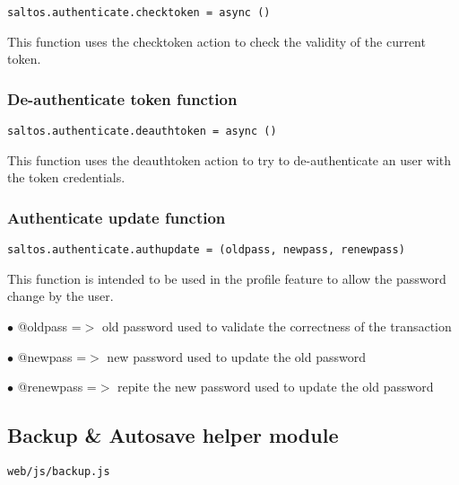 \documentclass[a4paper]{article}
\begin{document}
\begin{lstlisting}
saltos.authenticate.checktoken = async ()
\end{lstlisting}

This function uses the checktoken action to check the validity of the current token.

\hypertarget{toc585}{}
\subsubsection{De-authenticate token function}

\begin{lstlisting}
saltos.authenticate.deauthtoken = async ()
\end{lstlisting}

This function uses the deauthtoken action to try to de-authenticate an user with the token
credentials.

\hypertarget{toc586}{}
\subsubsection{Authenticate update function}

\begin{lstlisting}
saltos.authenticate.authupdate = (oldpass, newpass, renewpass)
\end{lstlisting}

This function is intended to be used in the profile feature to allow the password change
by the user.

\begin{compactitem}
\item[\color{myblue}$\bullet$] @oldpass   =$>$ old password used to validate the correctness of the transaction
\item[\color{myblue}$\bullet$] @newpass   =$>$ new password used to update the old password
\item[\color{myblue}$\bullet$] @renewpass =$>$ repite the new password used to update the old password
\end{compactitem}

\hypertarget{toc587}{}
\subsection{Backup \& Autosave helper module}

\begin{lstlisting}
web/js/backup.js
\end{lstlisting}
\end{document}
